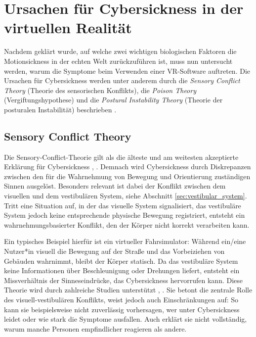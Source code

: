 \section{Ursachen für Cybersickness in der virtuellen Realität}
Nachdem geklärt wurde, auf welche zwei wichtigen biologischen Faktoren die Motionsickness in der echten Welt zurückzuführen ist, muss nun untersucht werden, warum die Symptome beim Verwenden einer VR-Software auftreten.
Die Ursachen für Cybersickness werden unter anderem durch die \emph{Sensory Conflict Theory} (Theorie des sensorischen Konflikts), die \emph{Poison Theory} (Vergiftungshypothese) und die \emph{Postural Instability Theory} (Theorie der posturalen Instabilität) beschrieben \cite{Josephj.LaViolaJr.2000}.

\subsection{Sensory Conflict Theory}\label{sec:sensory_conflict_theory}
Die Sensory-Conflict-Theorie gilt als die älteste und am weitesten akzeptierte Erklärung für Cybersickness \cite{Josephj.LaViolaJr.2000}, \cite{Gavgani2018}. Demnach wird Cybersickness durch Diskrepanzen zwischen den für die Wahrnehmung von Bewegung und Orientierung zuständigen Sinnen ausgelöst. Besonders relevant ist dabei der Konflikt zwischen dem visuellen und dem vestibulären System, siehe Abschnitt \ref{sec:vestibular_system}. Tritt eine Situation auf, in der das visuelle System signalisiert, das vestibuläre System jedoch keine entsprechende physische Bewegung registriert, entsteht ein wahrnehmungsbasierter Konflikt, den der Körper nicht korrekt verarbeiten kann.

Ein typisches Beispiel hierfür ist ein virtueller Fahrsimulator: Während ein/eine Nutzer*in visuell die Bewegung auf der Straße und das Vorbeiziehen von Gebäuden wahrnimmt, bleibt der Körper statisch. Da das vestibuläre System keine Informationen über Beschleunigung oder Drehungen liefert, entsteht ein Missverhältnis der Sinneseindrücke, das Cybersickness hervorrufen kann. Diese Theorie wird durch zahlreiche Studien unterstützt \cite{L.A.Warwick-Evans*N.Symons1999}, \cite{ParkS.-Y.;Koo2025}. Sie betont die zentrale Rolle des visuell-vestibulären Konflikts, weist jedoch auch Einschränkungen auf: So kann sie beispielsweise nicht zuverlässig vorhersagen, wer unter Cybersickness leidet oder wie stark die Symptome ausfallen. Auch erklärt sie nicht vollständig, warum manche Personen empfindlicher reagieren als andere. 

